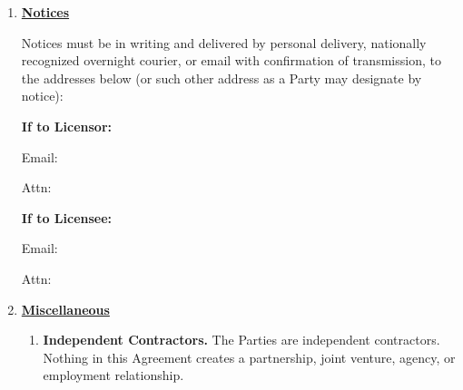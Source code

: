 \begin{enumerate}[leftmargin=*, label=\arabic*.]
\begin{enumerate}[leftmargin=*, label=\arabic{enumi}.\arabic*]
		\item \textbf{Protection.} Each Party will use the other Party's Confidential Information
		only to perform under this Agreement and will protect it using at least reasonable care.

		\item \textbf{Exclusions.} Confidential Information does not include information that
		becomes publicly available through no breach, was already known without duty of
		confidentiality, is received from a third party without breach, or is independently
		developed without use of the Confidential Information.

		\item \textbf{Compelled Disclosure.} A Party may disclose Confidential Information if
		required by law or court order, provided it gives prompt notice (if permitted) and
		cooperates to seek confidential treatment.
	\end{enumerate}

	\item \textbf{\uline{Notices}}

	Notices must be in writing and delivered by personal delivery, nationally recognized
	overnight courier, or email with confirmation of transmission, to the addresses below (or
	such other address as a Party may designate by notice):

	\par\medskip\noindent\textbf{If to Licensor:}\par
	\noindent \companyName\par
	\noindent Email: \licensorEmail\par
	\noindent Attn: \licensorAttn\par

	\par\medskip\noindent\textbf{If to Licensee:}\par
	\noindent \licenseeName\par
	\noindent Email: \licenseeEmail\par
	\noindent Attn: \licenseeAttn\par

	\item \textbf{\uline{Miscellaneous}}

	\begin{enumerate}[leftmargin=*, label=\arabic{enumi}.\arabic*]
		\item \textbf{Independent Contractors.} The Parties are independent contractors. Nothing
		in this Agreement creates a partnership, joint venture, agency, or employment
		relationship.


\end{enumerate}
\end{enumerate}

